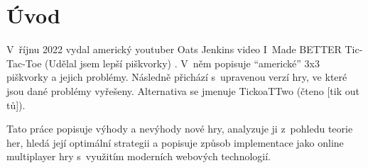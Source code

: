 \makeatletter
\renewcommand{\@chapapp}{}%
\newenvironment{chapquote}[2][2em]
  {\setlength{\@tempdima}{#1}%
   \def\chapquote@author{#2}%
   \parshape 1 \@tempdima \dimexpr\textwidth-2\@tempdima\relax%
   \itshape}
  {\par\normalfont\hfill--\ \chapquote@author\hspace*{\@tempdima}\par\bigskip}
\makeatother

\chapter*{Úvod}

V~říjnu 2022 vydal americký youtuber Oats Jenkins video I~Made BETTER
Tic-Tac-Toe (Udělal jsem lepší piškvorky) \cite{jenkins22}. V~něm popisuje
\enquote{americké} 3x3 piškvorky a jejich problémy. Následně přichází
s~upravenou verzí hry, ve které jsou dané problémy vyřešeny. Alternativa se
jmenuje TickoaTTwo (čteno [tik out tů]).

Tato práce popisuje výhody a nevýhody nové hry, analyzuje ji z~pohledu teorie
her, hledá její optimální strategii a popisuje způsob implementace jako online
multiplayer hry s~využitím moderních webových technologií.
